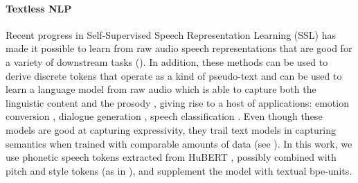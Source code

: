 \paragraph{Textless NLP} Recent progress in Self-Supervised Speech Representation Learning (SSL) \citep{baevski2020w2v2, hsu2021hubert, chen2022wavlm, chung2021w2vbert}
has made it possible to learn from raw audio speech representations that are good for a variety of downstream tasks (\citealp{yang2021superb}). In addition, these methods can be used to derive discrete tokens that operate as a kind of pseudo-text and can be used to learn a language model from raw audio \citep{gslm} which is able to capture both the linguistic content and the prosody \cite{kharitonov2022pgslm}, giving rise to a host of applications: emotion conversion \citep{kreuk2022emotionconversion}, dialogue generation \citep{nguyen2023dgslm}, speech classification \citep{chang2023speechpromptv2}. Even though these models are good at capturing expressivity, they trail text models in capturing semantics when trained with comparable amounts of data (see \citealp{nguyen2020zero, nguyen2023dgslm}).
In this work, we use phonetic speech tokens extracted from HuBERT \citep{hsu2021hubert}, possibly combined with pitch and style tokens (as in \citealp{kharitonov2022pgslm}), and supplement the model with textual bpe-units. %

